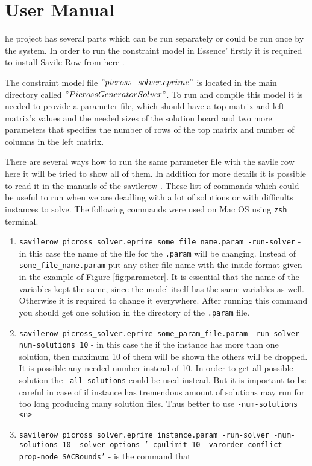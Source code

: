 \let\textcircled=\pgftextcircled
\chapter{User Manual}
\label{app:manual}
he project has several parts which can be run separately or could be run once by the system. In order to run the constraint model in Essence' firstly it is required to install Savile Row from here \cite{SavileRow:online}.

The constraint model file $"picross\_solver.eprime"$ is located in the main directory called $"PicrossGeneratorSolver"$. To run and compile this model it is needed to provide a parameter file, which should have a top matrix and left matrix's values and the needed sizes of the solution board and two more parameters that specifies the number of rows of the top matrix and number of columns in the left matrix. 

There are several ways how to run the same parameter file with the savile row here it will be tried to show all of them. In addition for more details it is possible to read it in the manuals of the savilerow \cite{savilerow_manual}. These list of commands which could be useful to run when we are deadling with a lot of solutions or with difficults instances to solve. The following commands were used on Mac OS using \texttt{zsh} terminal.

\begin{enumerate}
	\item \texttt{savilerow picross\_solver.eprime some\_file\_name.param -run-solver} - 
	in this case the name of the file for the \texttt{.param} will be changing. Instead of \texttt{some\_file\_name.param} put any other file name with the inside format given in the example of Figure \ref{fig:parameter}. It is essential that the name of the variables kept the same, since the model itself has the same variables as well. Otherwise it is required to change it everywhere. After running this command you should get one solution in the directory of the \texttt{.param} file.


	\item \texttt{savilerow picross\_solver.eprime some\_param\_file.param -run-solver -num-solutions 10} - in this case the if the instance has more than one solution, then maximum 10 of them will be shown the others will be dropped. It is possible any needed number instead of 10. In order to get all possible solution the \texttt{-all-solutions} could be used instead. But it is important to be careful in case of if instance has tremendous amount of solutions may run for too long producing many solution files. Thus better to use \texttt{-num-solutions <n>}

	\item \texttt{savilerow picross\_solver.eprime instance.param -run-solver -num-solutions 10 -solver-options '-cpulimit 10 -varorder conflict -prop-node SACBounds'} - is the command that 


\end{enumerate}

